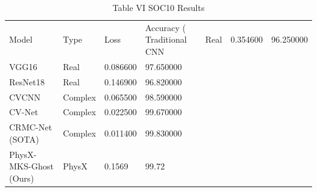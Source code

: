 \begin{table}
\caption{Table VI SOC10 Results}
\begin{tabular}{llll}
\toprule
Model & Type & Loss & Accuracy (%
\midrule
Traditional CNN & Real & 0.354600 & 96.250000 \\
VGG16 & Real & 0.086600 & 97.650000 \\
ResNet18 & Real & 0.146900 & 96.820000 \\
CVCNN & Complex & 0.065500 & 98.590000 \\
CV-Net & Complex & 0.022500 & 99.670000 \\
CRMC-Net (SOTA) & Complex & 0.011400 & 99.830000 \\
PhysX-MKS-Ghost (Ours) & PhysX & 0.1569 & 99.72 \\
\bottomrule
\end{tabular}
\end{table}
